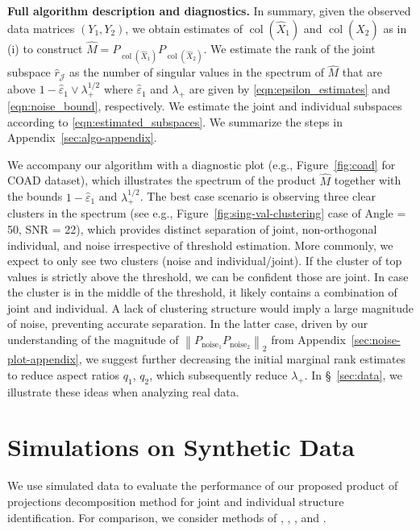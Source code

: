 \documentclass{amsart}
\DeclareMathOperator*{\col}{col}
\begin{document}
\textbf{Full algorithm description and diagnostics.} In summary, given the observed data matrices $(Y_1,Y_2)$, we obtain estimates of $\col (\widehat{X}_1)$ and $\col (\widehat{X}_2)$ as in (i) to construct $\widehat{M} = P_{\col (\widehat{X}_1)} P_{\col (\widehat{X}_2)}$. We estimate the rank of the joint subspace $\widehat{r}_{\mathcal{J}}$ as the number of singular values in the spectrum of $\widehat{M}$ that are above $1-\widehat{\varepsilon}_1 \vee \lambda_{+}^{1/2}$ where $\widehat{\varepsilon}_1$ and $\lambda_+$ are given by \eqref{eqn:epsilon_estimates} and \eqref{eqn:noise_bound}, respectively. We estimate the joint and individual subspaces according to \eqref{eqn:estimated_subspaces}. We summarize the steps in Appendix~\ref{sec:algo-appendix}.

We accompany our algorithm with a diagnostic plot (e.g., Figure~\ref{fig:coad} for COAD dataset), which illustrates the spectrum of the product $\widehat{M}$ together with the bounds $1-\widehat{\varepsilon}_1$ and $\lambda_+^{1/2}$. 
 The best case scenario is observing three clear clusters in the spectrum (see e.g., Figure~\ref{fig:sing-val-clustering} case of Angle = 50, SNR = 22), which provides distinct separation of joint, non-orthogonal individual, and noise irrespective of threshold estimation. More commonly, we expect to only see two clusters (noise and individual/joint). If the cluster of top values is strictly above the threshold, we can be confident those are joint. In case the cluster is in the middle of the threshold, it likely contains a combination of joint and individual. A lack of clustering structure would imply a large magnitude of noise, preventing accurate separation. In the latter case, driven by our understanding of the magnitude of $\left\|P_{\text{noise}_1}P_{\text{noise}_2}\right\|_2$ from Appendix~\ref{sec:noise-plot-appendix}, we suggest further decreasing the initial marginal rank estimates to reduce aspect ratios $q_1$, $q_2$, which subsequently reduce $\lambda_+$. In \S~\ref{sec:data}, we illustrate these ideas when analyzing real data. %

\section{Simulations on Synthetic Data}
\label{sec:simulation}



We use simulated data to evaluate the performance of our proposed product of projections decomposition method for joint and individual structure identification. For comparison, we consider methods of \citet{lock2013joint}, \citet{feng2018angle},  \citet{gaynanova2019structural}, \citet{shu2019d} and \citet{park2020integrative}. 
\end{document}

